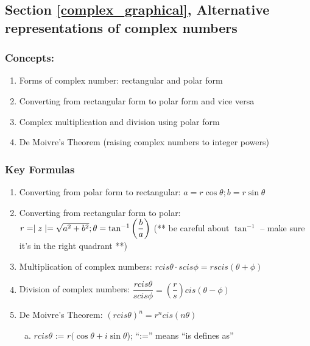 \subsection*{Section \ref{complex_graphical}, Alternative representations of complex numbers}
\subsubsection*{Concepts:}
\begin{enumerate}
\item 
Forms of complex number: rectangular and polar form
\item
Converting from rectangular form to polar form and vice versa
\item
Complex multiplication and division using polar form
\item
De Moivre's Theorem (raising complex numbers to integer powers)
\end{enumerate}

\subsubsection*{Key Formulas}
\begin{enumerate}
\item 
Converting from polar form to rectangular: $a = r\cos\theta; b = r\sin\theta$
\item 
Converting from rectangular form to polar: $r = \mid z \mid = \sqrt{a^{2}+b^{2}}; \\\theta = \tan^{-1}\left(\dfrac{b}{a}\right)$ (** be careful about $\tan^{-1}$ – make sure it’s in the right quadrant **)    
\item 
Multiplication of complex numbers: $rcis \theta \cdot scis \phi = rscis(\theta + \phi)$ 
\item 
Division of complex numbers: $\dfrac{rcis \theta}{scis \phi} = \left(\dfrac{r}{s}\right)cis(\theta - \phi)$
\item 
De Moivre’s Theorem: $(rcis \theta)^{n} = r^{n}cis(n \theta)$

\begin{enumerate}[(a)]
\item
$rcis \theta \text{ := } r(\cos\theta +  i\sin\theta$); ``:='' means ``is defines as''
\end{enumerate}
\end{enumerate}

